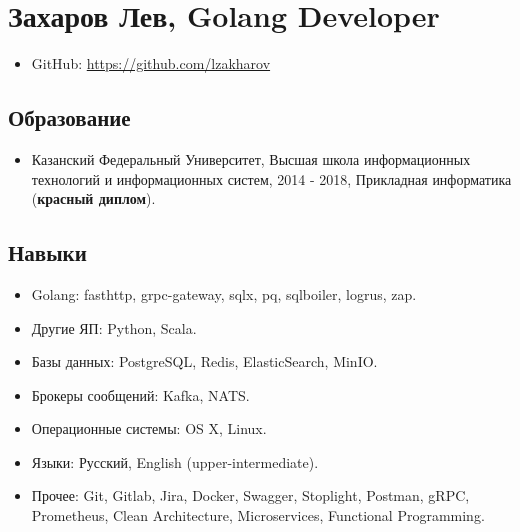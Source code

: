 \documentclass[11pt]{article}
\author{John Doe}
\date{\today}
\title{}
\begin{document}
\tableofcontents

\section{Захаров Лев, Golang Developer}
\label{sec:org096322b}
\begin{itemize}
\item GitHub: \url{https://github.com/lzakharov}
\end{itemize}

\subsection{Образование}
\label{sec:orgb722825}
\begin{itemize}
\item Казанский Федеральный Университет, Высшая школа информационных технологий и
информационных систем, 2014 - 2018, Прикладная информатика (\textbf{красный диплом}).
\end{itemize}
\subsection{Навыки}
\label{sec:orgec2be8a}
\begin{itemize}
\item Golang: fasthttp, grpc-gateway, sqlx, pq, sqlboiler, logrus, zap.
\item Другие ЯП: Python, Scala.
\item Базы данных: PostgreSQL, Redis, ElasticSearch, MinIO.
\item Брокеры сообщений: Kafka, NATS.
\item Операционные системы: OS X, Linux.
\item Языки: Русский, English (upper-intermediate).
\item Прочее: Git, Gitlab, Jira, Docker, Swagger, Stoplight, Postman, gRPC,
Prometheus, Clean Architecture, Microservices, Functional Programming.
\end{itemize}
\end{document}
